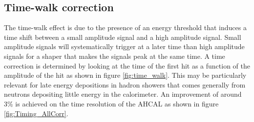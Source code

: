 \documentclass{JINST}
\begin{document}
\subsection{Time-walk correction}
\label{sec:TWCorr}

The time-walk effect is due to the presence of an energy threshold that induces a time shift between a small amplitude signal and a high amplitude signal. Small amplitude signals will systematically trigger at a later time than high amplitude signals for a shaper that makes the signals peak at the same time. A time correction is determined by looking at the time of the first hit as a function of the amplitude of the hit as shown in figure \ref{fig:time_walk}. This may be particularly relevant for late energy depositions in hadron showers that comes generally from neutrons depositing little energy in the calorimeter. An improvement of around 3\% is achieved on the time resolution of the AHCAL as shown in figure \ref{fig:Timing_AllCorr}.
\end{document}

